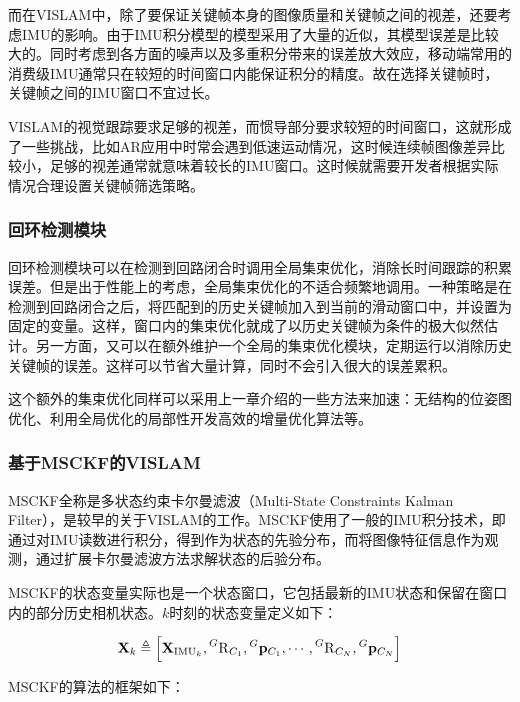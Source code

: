 而在VISLAM中，除了要保证关键帧本身的图像质量和关键帧之间的视差，还要考虑IMU的影响。由于IMU积分模型的模型采用了大量的近似，其模型误差是比较大的。同时考虑到各方面的噪声以及多重积分带来的误差放大效应，移动端常用的消费级IMU通常只在较短的时间窗口内能保证积分的精度。故在选择关键帧时，关键帧之间的IMU窗口不宜过长。

VISLAM的视觉跟踪要求足够的视差，而惯导部分要求较短的时间窗口，这就形成了一些挑战，比如AR应用中时常会遇到低速运动情况，这时候连续帧图像差异比较小，足够的视差通常就意味着较长的IMU窗口。这时候就需要开发者根据实际情况合理设置关键帧筛选策略。

\subsubsection{回环检测模块}

回环检测模块可以在检测到回路闭合时调用全局集束优化，消除长时间跟踪的积累误差。但是出于性能上的考虑，全局集束优化的不适合频繁地调用。一种策略是在检测到回路闭合之后，将匹配到的历史关键帧加入到当前的滑动窗口中，并设置为固定的变量。这样，窗口内的集束优化就成了以历史关键帧为条件的极大似然估计。另一方面，又可以在额外维护一个全局的集束优化模块，定期运行以消除历史关键帧的误差。这样可以节省大量计算，同时不会引入很大的误差累积。

这个额外的集束优化同样可以采用上一章介绍的一些方法来加速：无结构的位姿图优化、利用全局优化的局部性开发高效的增量优化算法等。

\subsubsection{基于MSCKF的VISLAM}

MSCKF全称是多状态约束卡尔曼滤波（Multi-State Constraints Kalman Filter），是较早的关于VISLAM的工作。MSCKF使用了一般的IMU积分技术，即通过对IMU读数进行积分，得到作为状态的先验分布，而将图像特征信息作为观测，通过扩展卡尔曼滤波方法求解状态的后验分布。

MSCKF的状态变量实际也是一个状态窗口，它包括最新的IMU状态和保留在窗口内的部分历史相机状态。$k$时刻的状态变量定义如下：

\begin{equation}
    \mathbf{X}_k \triangleq
    \left[
        \mathbf{X}_{\textrm{IMU}_k},
        \prescript{G}{}{\mathrm R}_{C_1},
        \prescript{G}{}{\mathbf p}_{C_1},
        \cdots,
        \prescript{G}{}{\mathrm R}_{C_N},
        \prescript{G}{}{\mathbf p}_{C_N}
    \right]
\end{equation}

MSCKF的算法的框架如下：

